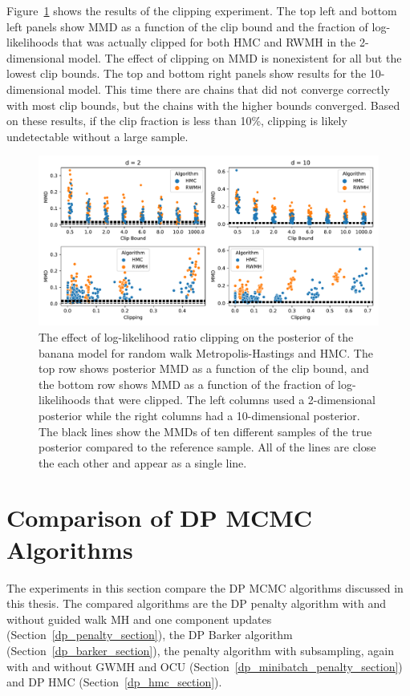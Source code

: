 \documentclass[english,twoside,openright]{HYgraduMLDS}
\begin{document}
Figure~\ref{clip_effect_fig} shows the results of the clipping experiment.
The top left and bottom left panels show MMD as a function of the clip bound 
and the fraction of log-likelihoods that was actually clipped for both
HMC and RWMH in the 2-dimensional model. The effect of clipping on MMD 
is nonexistent for all but the lowest clip bounds. The top and bottom right 
panels show results for the 10-dimensional model. This time there are chains 
that did not converge correctly with most clip bounds, but the chains with 
the higher bounds converged. Based on these results, if the clip fraction is 
less than 10\%, clipping is likely undetectable without a large sample.

\begin{figure}[h]
    \centering
    \includegraphics[width=\textwidth]{figures/clipping.pdf}
    \caption{
        The effect of log-likelihood ratio clipping on the posterior of the
        banana model for random walk Metropolis-Hastings and HMC.
        The top row shows posterior MMD as a function of the clip bound, and 
        the bottom row shows MMD as a function of the fraction of log-likelihoods
        that were clipped. The left columns used a 2-dimensional posterior 
        while the right columns had a 10-dimensional posterior. 
        The black lines show the MMDs of ten different samples of the true posterior
        compared to the reference sample. All of the lines are close the each 
        other and appear as a single line.
    }
    \label{clip_effect_fig}
\end{figure}

\section{Comparison of DP MCMC Algorithms}\label{dp_mcmc_comparison}

The experiments in this section compare the DP MCMC algorithms discussed in this
thesis. The compared algorithms are the DP penalty algorithm with and without
guided walk MH and one component updates~\cite{YildirimE19}
(Section~\ref{dp_penalty_section}), the DP Barker algorithm~\cite{HeikkilaJDH19}
(Section~\ref{dp_barker_section}), the penalty algorithm with subsampling, again
with and without GWMH and OCU (Section~\ref{dp_minibatch_penalty_section}) and
DP HMC (Section~\ref{dp_hmc_section}).
\end{document}
